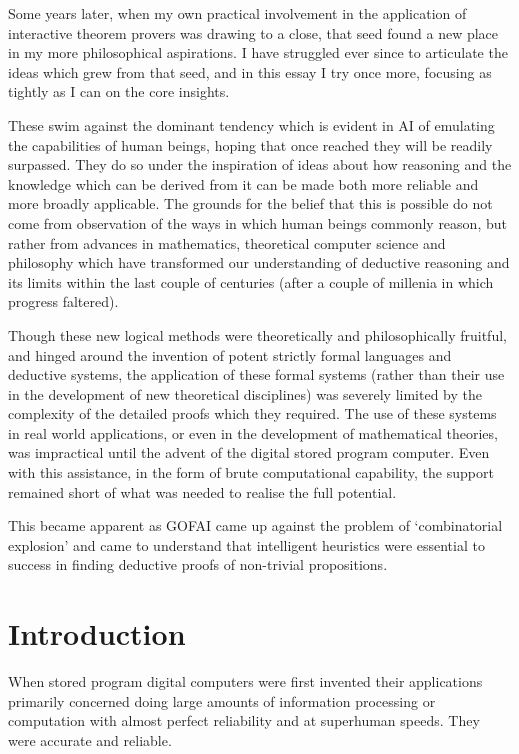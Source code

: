 \documentclass[10pt,titlepage]{article}
\begin{document}
Some years later, when my own practical involvement in the application of interactive theorem provers was drawing to a close, that seed found a new place in my more philosophical aspirations.
I have struggled ever since to articulate the ideas which grew from that seed, and in this essay I try once more, focusing as tightly as I can on the core insights.

These swim against the dominant tendency which is evident in AI of emulating the capabilities of human beings, hoping that once reached they will be readily surpassed.
They do so under the inspiration of ideas about how reasoning and the knowledge which can be derived from it can be made both more reliable and more broadly applicable.
The grounds for the belief that this is possible do not come from observation of the ways in which human beings commonly reason, but rather from advances in mathematics, theoretical computer science and philosophy which have transformed our understanding of deductive reasoning and its limits within the last couple of centuries (after a couple of millenia in which progress faltered).

Though these new logical methods were theoretically and philosophically fruitful, and hinged around the invention of potent strictly formal languages and deductive systems, the application of these formal systems (rather than their use in the development of new theoretical disciplines) was severely limited by the complexity of the detailed proofs which they required.
The use of these systems in real world applications, or even in the development of mathematical theories, was impractical until the advent of the digital stored program computer.
Even with this assistance, in the form of brute computational capability, the support remained short of what was needed to realise the full potential.

This became apparent as GOFAI came up against the problem of `combinatorial explosion' and came to understand that intelligent heuristics were essential to success in finding deductive proofs of non-trivial propositions.

\section{Introduction}

When stored program digital computers were first invented their applications primarily concerned doing large amounts of information processing or computation with almost perfect reliability and at superhuman speeds.
They were accurate and reliable.
\end{document}
